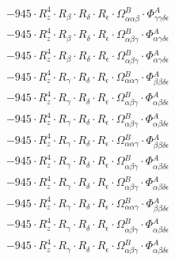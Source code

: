 \documentclass{article}
\begin{document}
\begin{subequations}
\begin{gather}
\begin{array}{c}
 \\[0.2em] 		 - 945 \cdot R_{z}^{4} \cdot R_{\beta{}} \cdot R_{\delta{}} \cdot R_{\epsilon{}} \cdot \Omega{}^{B}_{\alpha{}\alpha{}\beta{}} \cdot \Phi{}^{A}_{\gamma{}\gamma{}\delta{}\epsilon{}} 
 \\[0.2em] 		 - 945 \cdot R_{z}^{4} \cdot R_{\beta{}} \cdot R_{\delta{}} \cdot R_{\epsilon{}} \cdot \Omega{}^{B}_{\alpha{}\beta{}\gamma{}} \cdot \Phi{}^{A}_{\alpha{}\gamma{}\delta{}\epsilon{}} 
 \\[0.2em] 		 - 945 \cdot R_{z}^{4} \cdot R_{\beta{}} \cdot R_{\delta{}} \cdot R_{\epsilon{}} \cdot \Omega{}^{B}_{\alpha{}\beta{}\gamma{}} \cdot \Phi{}^{A}_{\alpha{}\gamma{}\delta{}\epsilon{}} 
 \\[0.2em] 		 - 945 \cdot R_{z}^{4} \cdot R_{\gamma{}} \cdot R_{\delta{}} \cdot R_{\epsilon{}} \cdot \Omega{}^{B}_{\alpha{}\alpha{}\gamma{}} \cdot \Phi{}^{A}_{\beta{}\beta{}\delta{}\epsilon{}} 
 \\[0.2em] 		 - 945 \cdot R_{z}^{4} \cdot R_{\gamma{}} \cdot R_{\delta{}} \cdot R_{\epsilon{}} \cdot \Omega{}^{B}_{\alpha{}\beta{}\gamma{}} \cdot \Phi{}^{A}_{\alpha{}\beta{}\delta{}\epsilon{}} 
 \\[0.2em] 		 - 945 \cdot R_{z}^{4} \cdot R_{\gamma{}} \cdot R_{\delta{}} \cdot R_{\epsilon{}} \cdot \Omega{}^{B}_{\alpha{}\beta{}\gamma{}} \cdot \Phi{}^{A}_{\alpha{}\beta{}\delta{}\epsilon{}} 
 \\[0.2em] 		 - 945 \cdot R_{z}^{4} \cdot R_{\gamma{}} \cdot R_{\delta{}} \cdot R_{\epsilon{}} \cdot \Omega{}^{B}_{\alpha{}\alpha{}\gamma{}} \cdot \Phi{}^{A}_{\beta{}\beta{}\delta{}\epsilon{}} 
 \\[0.2em] 		 - 945 \cdot R_{z}^{4} \cdot R_{\gamma{}} \cdot R_{\delta{}} \cdot R_{\epsilon{}} \cdot \Omega{}^{B}_{\alpha{}\beta{}\gamma{}} \cdot \Phi{}^{A}_{\alpha{}\beta{}\delta{}\epsilon{}} 
 \\[0.2em] 		 - 945 \cdot R_{z}^{4} \cdot R_{\gamma{}} \cdot R_{\delta{}} \cdot R_{\epsilon{}} \cdot \Omega{}^{B}_{\alpha{}\beta{}\gamma{}} \cdot \Phi{}^{A}_{\alpha{}\beta{}\delta{}\epsilon{}} 
 \\[0.2em] 		 - 945 \cdot R_{z}^{4} \cdot R_{\gamma{}} \cdot R_{\delta{}} \cdot R_{\epsilon{}} \cdot \Omega{}^{B}_{\alpha{}\alpha{}\gamma{}} \cdot \Phi{}^{A}_{\beta{}\beta{}\delta{}\epsilon{}} 
 \\[0.2em] 		 - 945 \cdot R_{z}^{4} \cdot R_{\gamma{}} \cdot R_{\delta{}} \cdot R_{\epsilon{}} \cdot \Omega{}^{B}_{\alpha{}\beta{}\gamma{}} \cdot \Phi{}^{A}_{\alpha{}\beta{}\delta{}\epsilon{}} 
 \\[0.2em] 		 - 945 \cdot R_{z}^{4} \cdot R_{\gamma{}} \cdot R_{\delta{}} \cdot R_{\epsilon{}} \cdot \Omega{}^{B}_{\alpha{}\beta{}\gamma{}} \cdot \Phi{}^{A}_{\alpha{}\beta{}\delta{}\epsilon{}} 

\end{array}
\end{gather}
\end{subequations}
\end{document}
